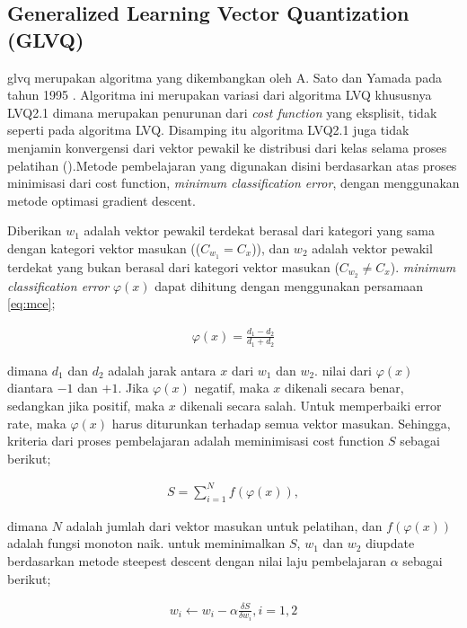 \subsection{Generalized Learning Vector Quantization (GLVQ)}
\label{ssec:glvq}

\Gls{glvq} merupakan algoritma yang dikembangkan oleh A. Sato dan Yamada pada
tahun 1995 \cite{Sato:1995}. Algoritma ini merupakan variasi dari algoritma LVQ
khususnya LVQ2.1 dimana merupakan penurunan dari \textit{cost function} yang
eksplisit, tidak seperti pada algoritma LVQ. Disamping itu algoritma LVQ2.1 juga
tidak menjamin konvergensi dari vektor pewakil ke distribusi dari kelas selama
proses pelatihan (\cite{Sato:1995, Sato:1998}).Metode pembelajaran yang
digunakan disini berdasarkan atas proses minimisasi dari cost function,
\emph{minimum classification error}, dengan menggunakan metode optimasi
gradient descent.

Diberikan $w_1$ adalah vektor pewakil terdekat berasal dari kategori yang sama
dengan kategori vektor masukan (($C_{w_1} = C_x$)), dan $w_2$ adalah vektor
pewakil terdekat yang bukan berasal dari kategori vektor masukan ($C_{w_2} \neq
C_x$). \emph{minimum classification error} $\varphi(x)$ dapat dihitung dengan
menggunakan persamaan \ref{eq:mce};
 
\begin{align}
\label{eq:mce}
	\varphi(x) = \frac{d_1 - d_2}{d_1 + d_2}
\end{align}

\noindent dimana $d_1$ dan $d_2$ adalah jarak antara $x$ dari $w_1$ dan $w_2$.
nilai dari $\varphi(x)$ diantara $-1$ dan $+1$. Jika $\varphi(x)$ negatif, maka
$x$ dikenali secara benar, sedangkan jika positif, maka $x$ dikenali secara
salah. Untuk memperbaiki error rate, maka $\varphi(x)$ harus diturunkan terhadap
semua vektor masukan. Sehingga, kriteria dari proses pembelajaran adalah
meminimisasi cost function $S$ sebagai berikut;

\begin{align}
\label{eq:costS}
	S = \sum_{i=1}^{N} f(\varphi(x)), 
\end{align}

\noindent dimana $N$ adalah jumlah dari vektor masukan untuk pelatihan, dan
$f(\varphi(x))$ adalah fungsi monoton naik. untuk meminimalkan $S$, $w_1$ dan
$w_2$ diupdate berdasarkan metode steepest descent dengan nilai laju
pembelajaran $\alpha$ sebagai berikut;

\begin{align}
\label{eq:genuprule}
	w_i \leftarrow w_i - \alpha \frac{\delta S}{\delta w_i}, i = 1, 2
\end{align}


